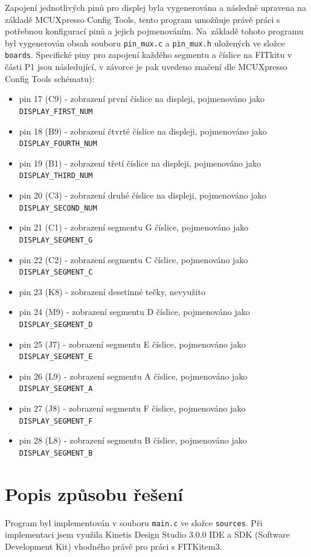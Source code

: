 \documentclass[a4paper, 11pt]{article}
\begin{document}
Zapojení jednotlivých pinů pro displej byla vygenerována a následně upravena na základě MCUXpresso Config Tools, tento program umožňuje právě práci s potřebnou konfigurací pinů a jejich pojmenováním. Na~základě tohoto programu byl vygenerován obsah souboru \verb|pin_mux.c| a \verb|pin_mux.h| uložených ve složce \verb|boards|. Specifické piny pro zapojení každého segmentu a číslice na FITkitu v části P1 jsou následující, v závorce je pak uvedeno značení dle MCUXpresso Config Tools schématu):
\begin{itemize}
    \item pin 17 (C9) - zobrazení první číslice na displeji, pojmenováno jako \verb|DISPLAY_FIRST_NUM|
    \item pin 18 (B9) - zobrazení čtvrté číslice na displeji, pojmenováno jako \verb|DISPLAY_FOURTH_NUM|
    \item pin 19 (B1) - zobrazení třetí číslice na displeji, pojmenováno jako \verb|DISPLAY_THIRD_NUM|
    \item pin 20 (C3) - zobrazení druhé číslice na displeji, pojmenováno jako \verb|DISPLAY_SECOND_NUM|
    \item pin 21 (C1) - zobrazení segmentu G číslice, pojmenováno jako \verb|DISPLAY_SEGMENT_G|
    \item pin 22 (C2) - zobrazení segmentu C číslice, pojmenováno jako \verb|DISPLAY_SEGMENT_C|
    \item pin 23 (K8) - zobrazení desetinné tečky, nevyužito
    \item pin 24 (M9) - zobrazení segmentu D číslice, pojmenováno jako \verb|DISPLAY_SEGMENT_D|
    \item pin 25 (J7) - zobrazení segmentu E číslice, pojmenováno jako \verb|DISPLAY_SEGMENT_E|
    \item pin 26 (L9) - zobrazení segmentu A číslice, pojmenováno jako \verb|DISPLAY_SEGMENT_A|
    \item pin 27 (J8) - zobrazení segmentu F číslice, pojmenováno jako \verb|DISPLAY_SEGMENT_F|
    \item pin 28 (L8) - zobrazení segmentu B číslice, pojmenováno jako \verb|DISPLAY_SEGMENT_B|
\end{itemize}

\section{Popis způsobu řešení}
Program byl implementován v souboru \verb|main.c| ve složce \verb|sources|. Při implementaci jsem využila Kinetis Design Studio 3.0.0 IDE a SDK (Software Development Kit) vhodného právě pro práci s FITKitem3. 
\end{document}
